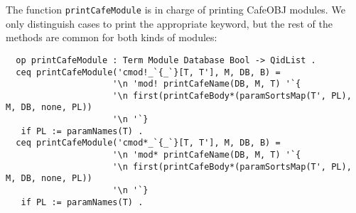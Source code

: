 {\codesize
\begin{comment}
  eq printCond(M, T := T' /\ C) = metaPrettyPrint(M, T, printOpts) ':=
                                  metaPrettyPrint(M, T', printOpts)
                                  if C == nil
                                  then nil
                                  else '/\ printCond(M, C)
                                  fi .
  eq printCond(M, T => T' /\ C) = metaPrettyPrint(M, T, printOpts) '=>
                                  metaPrettyPrint(M, T', printOpts)
                                  if C == nil
                                  then nil
                                  else '/\ printCond(M, C)
                                  fi .
  eq printCond(M, T : S /\ C) = metaPrettyPrint(M, T, printOpts) ': S
                                if C == nil
                                then nil
                                else '/\ printCond(M, C)
                                fi .

  op printCafeAtS : AttrSet -> QidList .
  eq printCafeAtS(label(Q) AtS) = printCafeAtS(AtS) .
  eq printCafeAtS(metadata("added") AtS) = printCafeAtS(AtS) .
  eq printCafeAtS(none) = nil .
  eq printCafeAtS(AtS) = '\g ' '`{ '\o printCafeAtSAux(AtS) '\g '`} '\o .

  op printCafeAtSAux : AttrSet -> QidList .
  eq printCafeAtSAux(nonexec AtS) = 'nonexec printCafeAtSAux(AtS) .
  eq printCafeAtSAux(AtS) = 'No 'print 'specified. .

  op printLabel : AttrSet -> QidList .
  ceq printLabel(label(Q) AtS) = ' '`[ Q '`] ' ':
   if substr(string(Q), 0, 5) =/= "lemma" .
  eq printLabel(AtS) = nil [owise] .
  **************************
  *** Print CafeOBJ Term ***
  **************************
\end{comment}
}

The function \verb"printCafeModule" is in charge of printing CafeOBJ modules.
We only distinguish cases to print the appropriate keyword, but the rest of the
methods are common for both kinds of modules:

{\codesize
\begin{verbatim}
  op printCafeModule : Term Module Database Bool -> QidList .
  ceq printCafeModule('cmod!_`{_`}[T, T'], M, DB, B) =
                     '\n 'mod! printCafeName(DB, M, T) '`{
                     '\n first(printCafeBody*(paramSortsMap(T', PL), M, DB, none, PL))
                     '\n '`}
   if PL := paramNames(T) .
  ceq printCafeModule('cmod*_`{_`}[T, T'], M, DB, B) =
                     '\n 'mod* printCafeName(DB, M, T) '`{
                     '\n first(printCafeBody*(paramSortsMap(T', PL), M, DB, none, PL))
                     '\n '`}
   if PL := paramNames(T) .
\end{verbatim}
}

